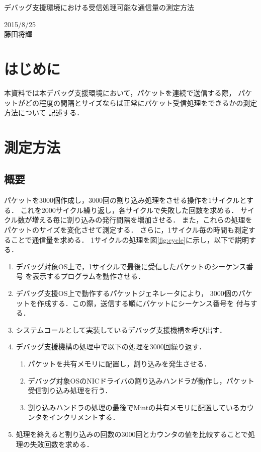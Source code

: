 \documentclass[12pt]{jsarticle}
\begin{document}

\begin{center}
    {\LARGE デバッグ支援環境における受信処理可能な通信量の測定方法}
\end{center}

\begin{flushright}
    2015/8/25\\
    藤田将輝
\end{flushright}
\section{はじめに}
本資料では本デバッグ支援環境において，パケットを連続で送信する際，
パケットがどの程度の間隔とサイズならば正常にパケット受信処理をできるかの測定方法について
記述する．

\section{測定方法}
\subsection{概要}
パケットを3000個作成し，3000回の割り込み処理をさせる操作を1サイクルとする．
これを2000サイクル繰り返し，各サイクルで失敗した回数を求める．
サイクル数が増える毎に割り込みの発行間隔を増加させる．
また，これらの処理をパケットのサイズを変化させて測定する．
さらに，1サイクル毎の時間も測定することで通信量を求める．
1サイクルの処理を図\ref{fig:cycle}に示し，以下で説明する．

\begin{enumerate}
    \item デバッグ対象OS上で，1サイクルで最後に受信したパケットのシーケンス番号
        を表示するプログラムを動作させる．
    \item デバッグ支援OS上で動作するパケットジェネレータにより，
        3000個のパケットを作成する．この際，送信する順にパケットにシーケンス番号を
        付与する．
    \item システムコールとして実装しているデバッグ支援機構を呼び出す．
    \item デバッグ支援機構の処理中で以下の処理を3000回繰り返す．
        \begin{enumerate}
            \item パケットを共有メモリに配置し，割り込みを発生させる．
            \item デバッグ対象OSのNICドライバの割り込みハンドラが動作し，パケット受信割り込み処理を行う．
            \item 割り込みハンドラの処理の最後でMintの共有メモリに配置しているカウンタをインクリメントする．
        \end{enumerate}
    \item 処理を終えると割り込みの回数の3000回とカウンタの値を比較することで処理の失敗回数を求める．
\end{enumerate}
\end{document}
